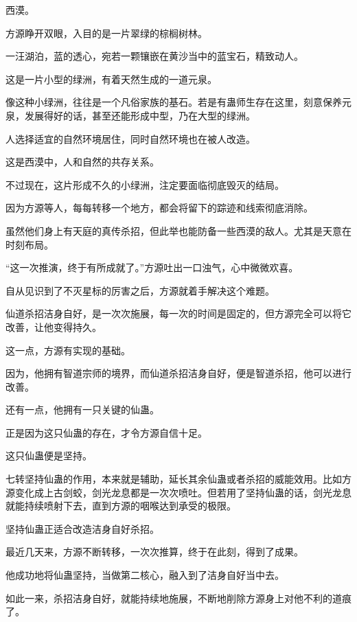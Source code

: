 
\begin{this_body}



西漠。

方源睁开双眼，入目的是一片翠绿的棕榈树林。

一汪湖泊，蓝的透心，宛若一颗镶嵌在黄沙当中的蓝宝石，精致动人。

这是一片小型的绿洲，有着天然生成的一道元泉。

像这种小绿洲，往往是一个凡俗家族的基石。若是有蛊师生存在这里，刻意保养元泉，发展得好的话，甚至还能形成中型，乃在大型的绿洲。

人选择适宜的自然环境居住，同时自然环境也在被人改造。

这是西漠中，人和自然的共存关系。

不过现在，这片形成不久的小绿洲，注定要面临彻底毁灭的结局。

因为方源等人，每每转移一个地方，都会将留下的踪迹和线索彻底消除。

虽然他们身上有天庭的真传杀招，但此举也能防备一些西漠的敌人。尤其是天意在时刻布局。

“这一次推演，终于有所成就了。”方源吐出一口浊气，心中微微欢喜。

自从见识到了不灭星标的厉害之后，方源就着手解决这个难题。

仙道杀招洁身自好，是一次次施展，每一次的时间是固定的，但方源完全可以将它改善，让他变得持久。

这一点，方源有实现的基础。

因为，他拥有智道宗师的境界，而仙道杀招洁身自好，便是智道杀招，他可以进行改善。

还有一点，他拥有一只关键的仙蛊。

正是因为这只仙蛊的存在，才令方源自信十足。

这只仙蛊便是坚持。

七转坚持仙蛊的作用，本来就是辅助，延长其余仙蛊或者杀招的威能效用。比如方源变化成上古剑蛟，剑光龙息都是一次次喷吐。但若用了坚持仙蛊的话，剑光龙息就能持续喷射下去，直到方源的咽喉达到承受的极限。

坚持仙蛊正适合改造洁身自好杀招。

最近几天来，方源不断转移，一次次推算，终于在此刻，得到了成果。

他成功地将仙蛊坚持，当做第二核心，融入到了洁身自好当中去。

如此一来，杀招洁身自好，就能持续地施展，不断地削除方源身上对他不利的道痕了。


\end{this_body}

